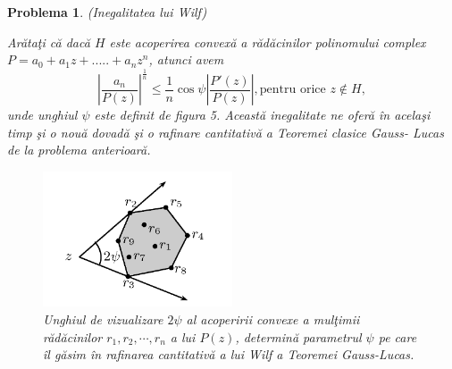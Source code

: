 \documentclass[a4paper,12pt,oneside]{report}
\newtheorem{problem}{Problema}
\begin{document}
\begin{problem} (Inegalitatea lui Wilf)

Ar\u{a}ta\c{t}i c\u{a} dac\u{a} \(H\) este acoperirea convex\u{a} a r\u{a}d\u{a}cinilor polinomului complex \(P = a_{0} + a_{1}z + ..... +a_{n}z^{n}\), atunci avem
\begin{displaymath}
  \left | \frac{a_{n}}{P\left ( z \right )} \right |^{\frac{1}{n}}\leq \frac{1}n\cos{\psi }\left | \frac{{P}'\left ( z \right )}{P\left ( z \right )} \right | , \text{pentru orice } z\notin H, \label{eq:2.16} \tag{2.16}
\end{displaymath}
unde unghiul \(\psi\) este definit de figura 5. Aceast\u{a} inegalitate ne ofer\u{a} \^{i}n acela\c{s}i timp \c{s}i o nou\u{a} dovad\u{a} \c{s}i o rafinare cantitativ\u{a}  a Teoremei clasice Gauss- Lucas de la problema anterioar\u{a}.

\begin{figure}[htbp]
	\centering
	\includegraphics[width=0.5\textwidth]{fig_pb14.png}
	\caption{ Unghiul de vizualizare \(2\psi\) al acoperirii convexe a mul\c{t}imii r\u{a}d\u{a}cinilor \(r_{1} , r_{2} , \cdots, r_{n}\) a lui \(P\left ( z \right )\), determin\u{a} parametrul \(\psi\) pe care \^{i}l g\u{a}sim \^{i}n rafinarea cantitativ\u{a} a lui Wilf a Teoremei Gauss-Lucas.}
\end{figure}

\end{problem}
\end{document}
